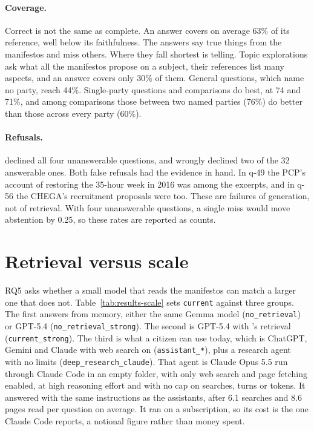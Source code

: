 \paragraph{Coverage.} Correct is not the same as complete. An answer covers
on average 63\% of its reference, well below its faithfulness. The answers say
true things from the manifestos and miss others. Where they fall shortest is
telling. Topic explorations ask what all the manifestos propose on a
subject, their references list many aspects, and an answer covers only 30\%
of them. General questions, which name no party, reach 44\%. Single-party
questions and comparisons do best, at 74 and 71\%, and among comparisons
those between two named parties (76\%) do better than those across every
party (60\%).

\paragraph{Refusals.} \sysname{} declined all four unanswerable questions,
and wrongly declined two of the 32 answerable ones. Both false refusals had
the evidence in hand. In q-49 the PCP's account of restoring the 35-hour week
in 2016 was among the excerpts, and in q-56 the CHEGA's recruitment
proposals were too. These are failures of generation, not of retrieval. With
four unanswerable questions, a single miss would move abstention by 0.25, so
these rates are reported as counts.

\section{Retrieval versus scale} \label{sec:results-scale}

RQ5 asks whether a small model that reads the manifestos can match a larger
one that does not. Table~\ref{tab:results-scale} sets \texttt{current} against
three groups. The first answers from memory, either the same Gemma model
(\texttt{no\_retrieval}) or GPT-5.4 (\texttt{no\_retrieval\_strong}). The second
is GPT-5.4 with \sysname{}'s retrieval (\texttt{current\_strong}). The third is
what a citizen can use today, which is ChatGPT, Gemini and Claude with web
search on (\texttt{assistant\_*}), plus a research agent with no limits
(\texttt{deep\_research\_claude}). That agent is Claude Opus 5.5 run through Claude
Code in an empty folder, with only web search and page fetching enabled, at
high reasoning effort and with no cap on searches, turns or tokens. It
answered with the same instructions as the assistants, after 6.1 searches and
8.6 pages read per question on average. It ran on a subscription, so its cost
is the one Claude Code reports, a notional figure rather than money spent.

